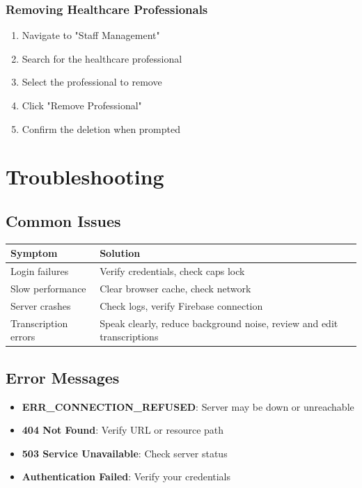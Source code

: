 \documentclass[12pt, titlepage]{article}
\begin{document}
\subsubsection{Removing Healthcare Professionals}
\begin{enumerate}
\item Navigate to "Staff Management"
\item Search for the healthcare professional
\item Select the professional to remove
\item Click "Remove Professional"
\item Confirm the deletion when prompted
\end{enumerate}

\section{Troubleshooting}
\subsection{Common Issues}
\begin{longtable}{p{}p{}}
\toprule
\textbf{Symptom} & \textbf{Solution} \\
\midrule
Login failures & Verify credentials, check caps lock \\
Slow performance & Clear browser cache, check network \\
Server crashes & Check logs, verify Firebase connection \\
Transcription errors & Speak clearly, reduce background noise, review and edit transcriptions \\
\bottomrule
\end{longtable}

\subsection{Error Messages}
\begin{itemize}
\item \textbf{ERR\_CONNECTION\_REFUSED}: Server may be down or unreachable
\item \textbf{404 Not Found}: Verify URL or resource path
\item \textbf{503 Service Unavailable}: Check server status
\item \textbf{Authentication Failed}: Verify your credentials
\end{itemize}
\end{document}

